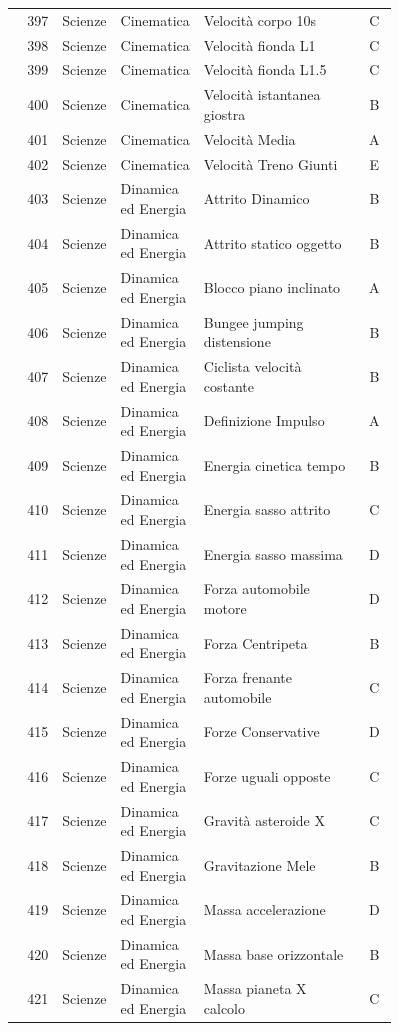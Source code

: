 \documentclass[20pt, a4paper]{article}
\begin{document}
\begin{longtable}{@{}r>{\raggedright\arraybackslash}p{0.14\linewidth}>{\raggedright\arraybackslash}p{0.20\linewidth}>{\raggedright\arraybackslash}p{0.42\linewidth}c@{}}
397 & Scienze & Cinematica & Velocità corpo 10s & C \\
398 & Scienze & Cinematica & Velocità fionda L1 & C \\
399 & Scienze & Cinematica & Velocità fionda L1.5 & C \\
400 & Scienze & Cinematica & Velocità istantanea giostra & B \\
401 & Scienze & Cinematica & Velocità Media & A \\
402 & Scienze & Cinematica & Velocità Treno Giunti & E \\
403 & Scienze & Dinamica ed Energia & Attrito Dinamico & B \\
404 & Scienze & Dinamica ed Energia & Attrito statico oggetto & B \\
405 & Scienze & Dinamica ed Energia & Blocco piano inclinato & A \\
406 & Scienze & Dinamica ed Energia & Bungee jumping distensione & B \\
407 & Scienze & Dinamica ed Energia & Ciclista velocità costante & B \\
408 & Scienze & Dinamica ed Energia & Definizione Impulso & A \\
409 & Scienze & Dinamica ed Energia & Energia cinetica tempo & B \\
410 & Scienze & Dinamica ed Energia & Energia sasso attrito & C \\
411 & Scienze & Dinamica ed Energia & Energia sasso massima & D \\
412 & Scienze & Dinamica ed Energia & Forza automobile motore & D \\
413 & Scienze & Dinamica ed Energia & Forza Centripeta & B \\
414 & Scienze & Dinamica ed Energia & Forza frenante automobile & C \\
415 & Scienze & Dinamica ed Energia & Forze Conservative & D \\
416 & Scienze & Dinamica ed Energia & Forze uguali opposte & C \\
417 & Scienze & Dinamica ed Energia & Gravità asteroide X & C \\
418 & Scienze & Dinamica ed Energia & Gravitazione Mele & B \\
419 & Scienze & Dinamica ed Energia & Massa accelerazione & D \\
420 & Scienze & Dinamica ed Energia & Massa base orizzontale & B \\
421 & Scienze & Dinamica ed Energia & Massa pianeta X calcolo & C \\

\end{longtable}
\end{document}
